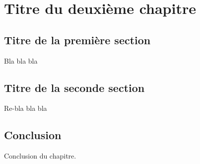 \chapter{Titre du deuxième chapitre}
\label{chapitre/titre_deuxieme_chapitre}
\section{Titre de la première section}
Bla bla bla
\section{Titre de la seconde section}
Re-bla bla bla

\section{Conclusion}
Conclusion du chapitre.

